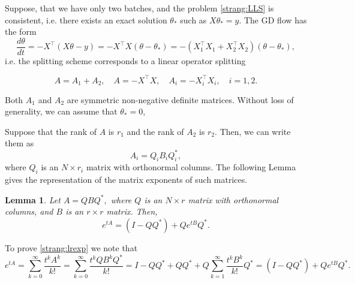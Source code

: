 \documentclass{article}
\newtheorem{lemma}{Lemma}
\begin{document}
Suppose, that we have only two batches, and the problem \eqref{strang:LLS} is consistent, i.e. there exists an exact solution $\theta_*$ such as $X \theta_* = y$. The GD flow has the form
\begin{equation}\label{strang:model1}
    \frac{d \theta}{d t} = -X^{\top} (X \theta - y) = -X^{\top} X(\theta - \theta_*) = -(X_1^{\top} X_1 + X^{\top}_2 X_2)(\theta - \theta_*),
\end{equation}
i.e. the splitting scheme corresponds to a linear operator splitting

$$
A = A_1 + A_2, \quad A = -X^{\top} X, \quad A_i = -X^{\top}_i X_i, \quad i = 1, 2.
$$

Both $A_1$ and $A_2$ are symmetric non-negative definite matrices. Without loss of generality, we can assume that $\theta_* = 0$,

Suppose that the rank of $A$ is $r_1$ and the rank of $A_2$ is $r_2$. Then, we can write them as
$$
A_i = Q_i B_i Q^*_i,
$$
where $Q_i$ is an $N \times r_i$ matrix with orthonormal columns.  The following Lemma gives the representation of the matrix exponents of such matrices.
\begin{lemma}\label{strang:lemexp}
Let $A = Q B Q^*,$ where $Q$ is an $N \times r$ matrix with orthonormal columns, and $B$ is an $r \times r$ matrix. Then,
\begin{equation}\label{strang:lrexp}
    e^{t A}  = (I - QQ^*) + Q e^{t B} Q^*.
\end{equation}
\end{lemma}
To prove \eqref{strang:lrexp} we note that
$$e^{t A} = \sum_{k=0}^{\infty} \frac{t^k A^k}{k!} = \sum_{k=0}^{\infty} \frac{t^k Q B^k Q^*}{k!} =
I - QQ^* + QQ^* + Q \sum_{k=1}^{\infty} \frac{t^k B^k}{k!} Q^* = (I - QQ^*) + Q e^{t B} Q^*.
$$
\end{document}
